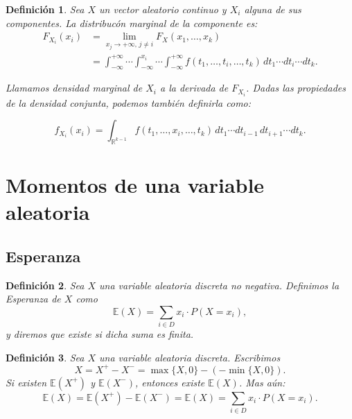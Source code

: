 \documentclass{report}
\newtheorem{dfn}{Definición}[section]
\begin{document}
\begin{dfn}
Sea $X$ un vector aleatorio continuo y $X_i$ alguna de sus componentes. La \emph{distribucón marginal} de la componente es:
\begin{equation*}
    \begin{split}
        F_{X_i}(x_i) & = \lim_{x_j \to +\infty, \, j \neq i} F_X(x_1, \dots, x_k)\\ 
        &= \int_{-\infty}^{+\infty} \cdots \int_{-\infty}^{x_i} \cdots \int_{-\infty}^{+\infty} 
        f(t_1, \dots, t_i, \dots, t_k) \, dt_1 \cdots dt_i \cdots dt_k.
    \end{split}
\end{equation*}

Llamamos \emph{densidad marginal} de \( X_i \) a la derivada de \( F_{X_i} \). Dadas las propiedades de la densidad conjunta,
podemos también definirla como:

\begin{equation*}
f_{X_i}(x_i) = \int_{\mathbb{R}^{k-1}} f(t_1, \dots, x_i, \dots, t_k) \, dt_1 \cdots dt_{i-1} \, dt_{i+1} \cdots dt_k.
\end{equation*}
\end{dfn}

\section{Momentos de una variable aleatoria}
\subsection{Esperanza}
\begin{dfn}
Sea $X$ una variable aleatoria discreta no negativa. Definimos la \emph{Esperanza} de $X$ como
\begin{equation*}
\mathbb{E}(X) = \sum_{i\in D} x_i \cdot P(X=x_i),
\end{equation*}
y diremos que existe si dicha suma es finita.    
\end{dfn}

\begin{dfn}
Sea $X$ una variable aleatoria discreta. Escribimos
\begin{equation*}
    X=X^+ - X^- = \max\{X,0\} - (-\min\{X,0\}).
\end{equation*}
Si existen $\mathbb{E}(X^+)$ y $\mathbb{E}(X^-)$, entonces existe $\mathbb{E}(X)$. Mas aún:
\begin{equation*}
    \mathbb{E}(X) = \mathbb{E}(X^+) - \mathbb{E}(X^-) = \mathbb{E}(X) = \sum_{i\in D} x_i \cdot P(X=x_i).
\end{equation*}
\end{dfn}
\end{document}

